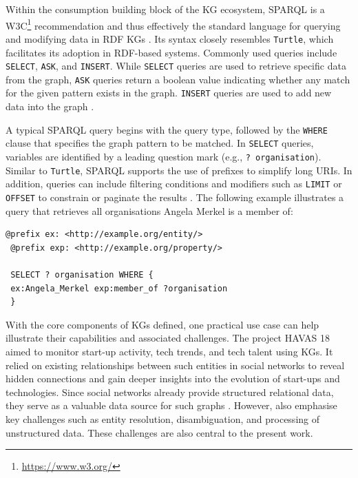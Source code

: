 \documentclass[a4paper,oneside,bibliography=totoc]{scrbook}
\begin{document}
Within the consumption building block of the \ac{KG} ecosystem, \ac{SPARQL} is a \ac{W3C}\footnote{\url{https://www.w3.org/}} recommendation and thus effectively the standard language for querying and modifying data in \ac{RDF} \acp{KG} \cite{Prudhommeaux2008}. Its syntax closely resembles \texttt{Turtle}, which facilitates its adoption in RDF-based systems. Commonly used queries include \texttt{SELECT}, \texttt{ASK}, and \texttt{INSERT}. While \texttt{SELECT} queries are used to retrieve specific data from the graph, \texttt{ASK} queries return a boolean value indicating whether any match for the given pattern exists in the graph. \texttt{INSERT} queries are used to add new data into the graph \cite{VillazonTerrazas2017}.

A typical \ac{SPARQL} query begins with the query type, followed by the \texttt{WHERE} clause that specifies the graph pattern to be matched. In \texttt{SELECT} queries, variables are identified by a leading question mark (e.g., \texttt{? organisation}). Similar to \texttt{Turtle}, \ac{SPARQL} supports the use of prefixes to simplify long \acp{URI}. In addition, queries can include filtering conditions and modifiers such as \texttt{LIMIT} or \texttt{OFFSET} to constrain or paginate the results \cite{VillazonTerrazas2017}. The following example illustrates a query that retrieves all organisations Angela Merkel is a member of:

\begin{lstlisting}[language=SPARQL, caption=Example of a \ac{SPARQL} Query, label=lst:turtle_example]
 @prefix ex: <http://example.org/entity/>
 @prefix exp: <http://example.org/property/>
  
 SELECT ? organisation WHERE {
 ex:Angela_Merkel exp:member_of ?organisation
 }
\end{lstlisting}

With the core components of \acp{KG} defined, one practical use case can help illustrate their capabilities and associated challenges. The project HAVAS 18 aimed to monitor start-up activity, tech trends, and tech talent using \acp{KG}. It relied on existing relationships between such entities in social networks to reveal hidden connections and gain deeper insights into the evolution of start-ups and technologies. Since social networks already provide structured relational data, they serve as a valuable data source for such graphs \cite{Monti2017}. However, \citet{Monti2017} also emphasise key challenges such as entity resolution, disambiguation, and processing of unstructured data. These challenges are also central to the present work.
\end{document}
